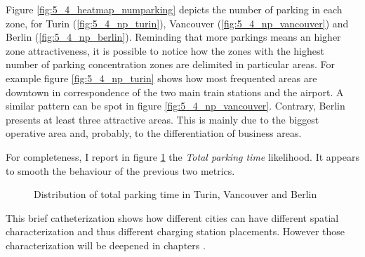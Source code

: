 Figure \ref{fig:5_4_heatmap_numparking} depicts the number of parking in each zone, for Turin (\ref{fig:5_4_np_turin}), Vancouver (\ref{fig:5_4_np_vancouver}) and Berlin (\ref{fig:5_4_np_berlin}). Reminding that more parkings means an higher zone attractiveness,
 it is possible to notice how the zones with the highest number of parking concentration zones are delimited in particular areas. For example figure \ref{fig:5_4_np_turin} shows how most frequented areas are downtown in correspondence of the two main train stations and the airport. A similar pattern can be spot in figure \ref{fig:5_4_np_vancouver}. Contrary, Berlin presents at least three attractive areas. This is mainly due to the biggest operative area and, probably, to the differentiation of business areas.
 
For completeness, I report in figure \ref{fig:5_4_heatmap_sumtime} the \textit{Total parking time} likelihood. It appears to smooth the behaviour of the previous two metrics.

\begin{figure}[th]
	\centering     %
	\quad
	\quad
	\caption{Distribution of total parking time in Turin, Vancouver and Berlin}
	\label{fig:5_4_heatmap_sumtime}
\end{figure} 

This brief catheterization shows how  different cities can have different spatial characterization and thus different charging station placements. However those characterization will be deepened in chapters .
